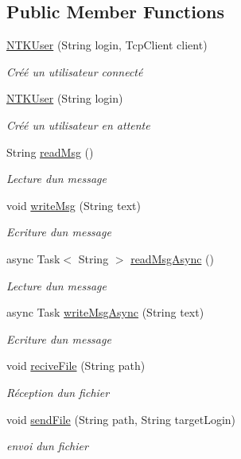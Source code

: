 \subsection*{Public Member Functions}
\begin{DoxyCompactItemize}
\item 
\mbox{\hyperlink{class_n_t_k_1_1_n_t_k_user_a0eb0ebce85f8a29328170881fe595ba0}{N\+T\+K\+User}} (String login, Tcp\+Client client)
\begin{DoxyCompactList}\small\item\em Créé un utilisateur connecté \end{DoxyCompactList}\item 
\mbox{\hyperlink{class_n_t_k_1_1_n_t_k_user_a5294dadef2cdf99e83b8cfeb952abf02}{N\+T\+K\+User}} (String login)
\begin{DoxyCompactList}\small\item\em Créé un utilisateur en attente \end{DoxyCompactList}\item 
String \mbox{\hyperlink{class_n_t_k_1_1_n_t_k_user_ac86726504956b16af40116d0f24d5368}{read\+Msg}} ()
\begin{DoxyCompactList}\small\item\em Lecture d\textquotesingle{}un message \end{DoxyCompactList}\item 
void \mbox{\hyperlink{class_n_t_k_1_1_n_t_k_user_a55435ca4759c1daa467be2479c2b598e}{write\+Msg}} (String text)
\begin{DoxyCompactList}\small\item\em Ecriture d\textquotesingle{}un message \end{DoxyCompactList}\item 
async Task$<$ String $>$ \mbox{\hyperlink{class_n_t_k_1_1_n_t_k_user_a049d42e91b000aefa6179750546e0a52}{read\+Msg\+Async}} ()
\begin{DoxyCompactList}\small\item\em Lecture d\textquotesingle{}un message \end{DoxyCompactList}\item 
async Task \mbox{\hyperlink{class_n_t_k_1_1_n_t_k_user_a729769d1f8aefcbec4350a8030943d96}{write\+Msg\+Async}} (String text)
\begin{DoxyCompactList}\small\item\em Ecriture d\textquotesingle{}un message \end{DoxyCompactList}\item 
void \mbox{\hyperlink{class_n_t_k_1_1_n_t_k_user_ae141a3d5ed333fa9fb5b2fbf3136f81f}{recive\+File}} (String path)
\begin{DoxyCompactList}\small\item\em Réception d\textquotesingle{}un fichier \end{DoxyCompactList}\item 
void \mbox{\hyperlink{class_n_t_k_1_1_n_t_k_user_a5e5f555882081eafcab8c919169cd5fe}{send\+File}} (String path, String target\+Login)
\begin{DoxyCompactList}\small\item\em envoi d\textquotesingle{}un fichier \end{DoxyCompactList}\end{DoxyCompactItemize}
